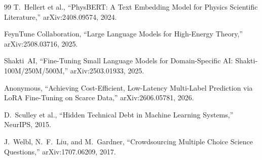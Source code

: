 \documentclass[11pt]{article}
\begin{document}
\begin{thebibliography}{99}
T.~Hellert et al.,
``PhysBERT: A Text Embedding Model for Physics Scientific Literature,''
arXiv:2408.09574, 2024.

FeynTune Collaboration,
``Large Language Models for High-Energy Theory,''
arXiv:2508.03716, 2025.

Shakti~AI,
``Fine-Tuning Small Language Models for Domain-Specific AI: Shakti-100M/250M/500M,''
arXiv:2503.01933, 2025.

Anonymous,
``Achieving Cost-Efficient, Low-Latency Multi-Label Prediction via LoRA Fine-Tuning on Scarce Data,''
arXiv:2606.05781, 2026.

D.~Sculley et al.,
``Hidden Technical Debt in Machine Learning Systems,''
NeurIPS, 2015.

J.~Welbl, N.~F.~Liu, and M.~Gardner,
``Crowdsourcing Multiple Choice Science Questions,''
arXiv:1707.06209, 2017.

\end{thebibliography}
\end{document}
